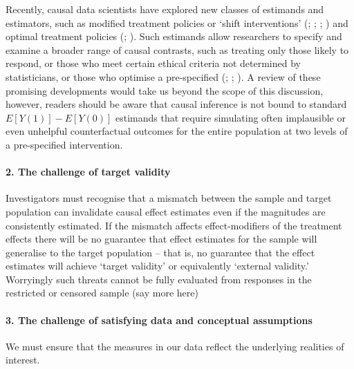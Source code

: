 \documentclass[
  singlecolumn]{article}
\let\oldparagraph\paragraph
\renewcommand{\paragraph}[1]{\oldparagraph{#1}\mbox{}}
\begin{document}
Recently, causal data scientists have explored new classes of estimands
and estimators, such as modified treatment policies or `shift
interventions' (;
;
;
) and optimal
treatment policies (;
). Such estimands
allow researchers to specify and examine a broader range of causal
contrasts, such as treating only those likely to respond, or those who
meet certain ethical criteria not determined by statisticians, or those
who optimise a pre-specified (; ;
). A review of these
promising developments would take us beyond the scope of this
discussion, however, readers should be aware that causal inference is
not bound to standard \(E[Y(1)] - E[Y(0)]\) estimands that require
simulating often implausible or even unhelpful counterfactual outcomes
for the entire population at two levels of a pre-specified intervention.

\paragraph{2. The challenge of target
validity}\label{the-challenge-of-target-validity}

Investigators must recognise that a mismatch between the sample and
target population can invalidate causal effect estimates even if the
magnitudes are consistently estimated. If the mismatch affects
effect-modifiers of the treatment effects there will be no guarantee
that effect estimates for the sample will generalise to the target
population -- that is, no guarantee that the effect estimates will
achieve `target validity' or equivalently `external validity.'
Worryingly such threats cannot be fully evaluated from responses in the
restricted or censored sample (say more here)

\paragraph{3. The challenge of satisfying data and conceptual
assumptions}\label{the-challenge-of-satisfying-data-and-conceptual-assumptions}

We must ensure that the measures in our data reflect the underlying
realities of interest.
\end{document}
